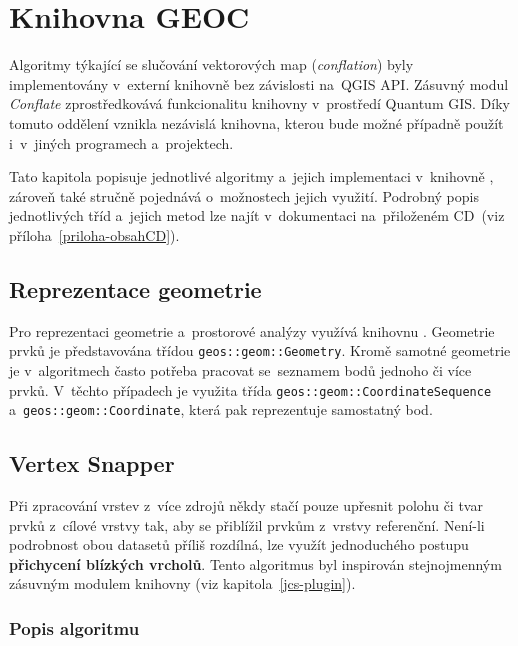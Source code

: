 \chapter{Knihovna GEOC}
\label{5-geoc}

Algoritmy týkající se slučování vektorových map (\textit{conflation}) byly
implementovány v~externí knihovně  bez závislosti na~QGIS API. 
Zásuvný modul \textit{Conflate} zprostředkovává funkcionalitu knihovny 
v~prostředí Quantum GIS. Díky tomuto oddělení vznikla nezávislá knihovna, 
kterou bude možné případně použít i~v~jiných programech a~projektech.

Tato kapitola popisuje jednotlivé algoritmy a~jejich implementaci v~knihovně
, zároveň také stručně pojednává o~možnostech  jejich využití.
Podrobný popis jednotlivých tříd a~jejich metod lze najít
v~dokumentaci na~přiloženém CD~(viz příloha~\ref{priloha-obsahCD}). 


\section{Reprezentace geometrie}
\label{reprezentace-geom}

Pro reprezentaci geometrie a~prostorové analýzy  využívá
knihovnu . Geometrie prvků je představována třídou 
\texttt{geos::geom::Geometry}. Kromě samotné geometrie je v~algoritmech
často potřeba pracovat se~seznamem bodů jednoho či více prvků. V~těchto
případech je využita třída \texttt{geos::geom::CoordinateSequence}
a~\texttt{geos::geom::Coordinate}, která pak reprezentuje samostatný bod.


\section{Vertex Snapper} 
\label{vertexsnapper}

Při zpracování vrstev z~více zdrojů někdy stačí pouze upřesnit polohu či tvar 
prvků z~cílové vrstvy tak, aby se přiblížil prvkům z~vrstvy referenční. 
\mbox{Není-li} podrobnost obou datasetů příliš rozdílná, lze využít jednoduchého 
postupu \textbf{přichycení blízkých vrcholů}. Tento algoritmus byl inspirován
stejnojmenným zásuvným mo\-dulem knihovny  (viz kapitola~\ref{jcs-plugin}).


\subsection{Popis algoritmu}
\label{vs-algoritmus}

